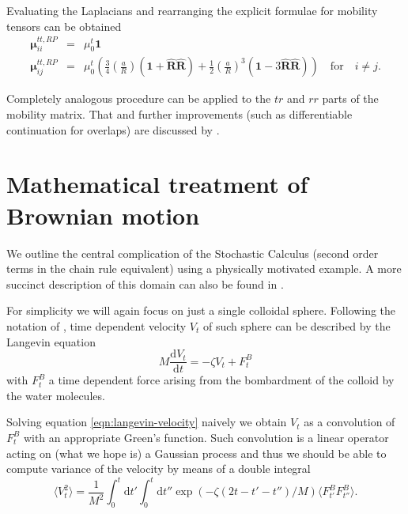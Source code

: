 \documentclass{doctoral}
\newcommand{\dd}{\mathrm{d}}
\begin{document}
Evaluating the Laplacians and rearranging the explicit formulae for mobility tensors can be obtained
\begin{eqnarray}
    \bm{\mu}_{ii}^{tt,RP} & = & \mu_0^t \bm{1}                                                                                                                                                                                                                                  \\
    \bm{\mu}_{ij}^{tt,RP} & = & \mu_0^t \left( \frac{3}{4} \left( \frac{a}{R} \right) \left( \bm{1} + \bm{\hat{R}}\bm{\hat{R}} \right) + \frac{1}{2} \left( \frac{a}{R} \right)^3 \left( \bm{1} -3  \bm{\hat{R}}\bm{\hat{R}} \right) \right) \quad \mathrm{for} \quad i \neq j.
    \label{eqn:rotne-prager-translation}
\end{eqnarray}

Completely analogous procedure can be applied to the $tr$ and $rr$ parts of the mobility matrix.
That and further improvements (such as differentiable continuation for overlaps) are discussed by \textcite{Zuk_2018}.

\section{Mathematical treatment of Brownian motion}
\label{sec:SDE}

We outline the central complication of the Stochastic Calculus (second order terms in the chain rule equivalent) using a physically motivated example.
A more succinct description of this domain can also be found in \textcite{Waszkiewicz_2023_pychastic}.

For simplicity we will again focus on just a single colloidal sphere.
Following the notation of \textcite{Ottinger_2012}, time dependent velocity $V_t$ of such sphere can be described by the Langevin equation
\begin{equation}
    M \frac{\dd V_t}{\dd t} = - \zeta V_t + F^{B}_t \label{eqn:langevin-velocity}
\end{equation}
with $F^B_t$ a time dependent force arising from the bombardment of the colloid by the water molecules.

Solving equation \eqref{eqn:langevin-velocity} naively we obtain $V_t$ as a convolution of $F_t^B$ with an appropriate Green's function.
Such convolution is a linear operator acting on (what we hope is) a Gaussian process and thus we should be able to compute variance of the velocity by means of a double integral
\begin{equation}
    \langle V_t^2 \rangle = \frac{1}{M^2} \int_0^t \dd t' \int_0^t \dd t'' \exp\left(-\zeta (2t - t' - t'') / M\right) \langle F_{t'}^B F_{t''}^B \rangle.
    \label{eqn:velocity-variance-integral}
\end{equation}
\end{document}
